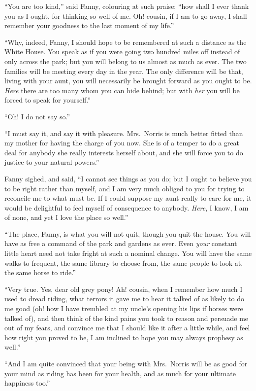 \documentclass{article}
\begin{document}
``You are too kind,'' said Fanny, colouring at such praise;
``how shall I ever thank you as I ought, for thinking
so well of me.  Oh! cousin, if I am to go away, I shall
remember your goodness to the last moment of my life.''

``Why, indeed, Fanny, I should hope to be remembered at
such a distance as the White House.  You speak as if you
were going two hundred miles off instead of only across
the park; but you will belong to us almost as much as ever.
The two families will be meeting every day in the year.
The only difference will be that, living with your aunt,
you will necessarily be brought forward as you ought to be.
\emph{Here} there are too many whom you can hide behind; but with
\emph{her} you will be forced to speak for yourself.''

``Oh!  I do not say so.''

``I must say it, and say it with pleasure.  Mrs.\ Norris
is much better fitted than my mother for having the charge
of you now.  She is of a temper to do a great deal
for anybody she really interests herself about, and she
will force you to do justice to your natural powers.''

Fanny sighed, and said, ``I cannot see things as you do;
but I ought to believe you to be right rather than myself,
and I am very much obliged to you for trying to reconcile
me to what must be.  If I could suppose my aunt really
to care for me, it would be delightful to feel myself
of consequence to anybody.  \emph{Here}, I know, I am of none,
and yet I love the place so well.''

``The place, Fanny, is what you will not quit, though you
quit the house.  You will have as free a command of the
park and gardens as ever.  Even \emph{your} constant little
heart need not take fright at such a nominal change.
You will have the same walks to frequent, the same library
to choose from, the same people to look at, the same horse
to ride.''

``Very true.  Yes, dear old grey pony!  Ah! cousin, when I
remember how much I used to dread riding, what terrors
it gave me to hear it talked of as likely to do me good
(oh! how I have trembled at my uncle's opening his lips
if horses were talked of), and then think of the kind
pains you took to reason and persuade me out of my fears,
and convince me that I should like it after a little while,
and feel how right you proved to be, I am inclined to hope
you may always prophesy as well.''

``And I am quite convinced that your being with Mrs.\ Norris
will be as good for your mind as riding has been for
your health, and as much for your ultimate happiness too.''
\end{document}
